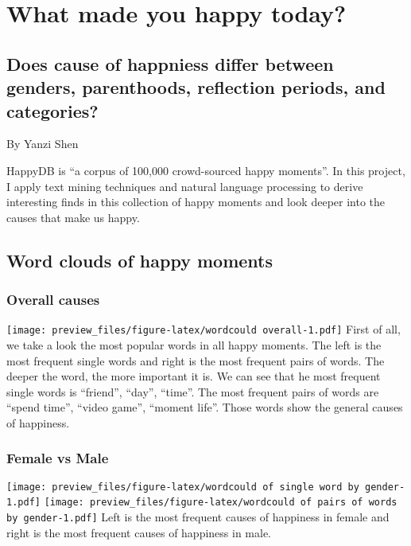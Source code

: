 \documentclass[]{article}
\title{}
\author{}
\date{}
\begin{document}
\section{\texorpdfstring{\textbf{What made you happy
today?}}{What made you happy today?}}\label{what-made-you-happy-today}

\subsection{\texorpdfstring{\textbf{Does cause of happniess differ
between genders, parenthoods, reflection periods, and
categories?}}{Does cause of happniess differ between genders, parenthoods, reflection periods, and categories?}}\label{does-cause-of-happniess-differ-between-genders-parenthoods-reflection-periods-and-categories}

By Yanzi Shen \newline

 HappyDB is ``a corpus of 100,000 crowd-sourced happy moments''. In this
project, I apply text mining techniques and natural language processing
to derive interesting finds in this collection of happy moments and look
deeper into the causes that make us happy.

\subsection{Word clouds of happy
moments}\label{word-clouds-of-happy-moments}

\subsubsection{Overall causes}\label{overall-causes}

\texttt{[image: preview\_files/figure-latex/wordcould overall-1.pdf]}
First of all, we take a look the most popular words in all happy
moments. The left is the most frequent single words and right is the
most frequent pairs of words. The deeper the word, the more important it
is. We can see that he most frequent single words is ``friend'',
``day'', ``time''. The most frequent pairs of words are ``spend time'',
``video game'', ``moment life''. Those words show the general causes of
happiness.

\subsubsection{Female vs Male}\label{female-vs-male}

\texttt{[image: preview\_files/figure-latex/wordcould of single word by gender-1.pdf]}
\texttt{[image: preview\_files/figure-latex/wordcould of pairs of words by gender-1.pdf]}
Left is the most frequent causes of happiness in female and right is the
most frequent causes of happiness in male.
\end{document}
